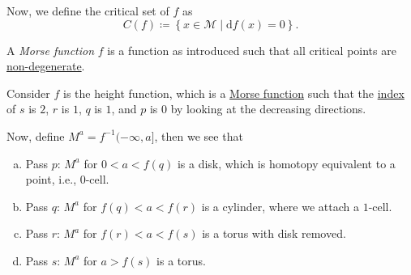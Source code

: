Now, we define the critical set of \(f\) as
\[
	C(f) \coloneqq \left\{ x\in \mathcal{M} \mid \mathrm{d} f(x) = 0 \right\}.
\]

\begin{definition}\label{def:Morse-function}
	A \emph{Morse function} \(f\) is a function as introduced such that all critical points are \hyperref[def:non-degenerate]{non-degenerate}.
\end{definition}

\begin{eg}
	Consider \(f\) is the height function, which is a \hyperref[def:Morse-function]{Morse function} such that the \hyperref[def:Morse-index]{index} of \(s\) is \(2\), \(r\) is \(1\), \(q\) is \(1\), and \(p\) is \(0\) by looking at the decreasing directions.
	\begin{center}
	\end{center}
	Now, define \(M^a = f^{-1} (-\infty , a]\), then we see that
	\begin{enumerate}[(a)]
		\item Pass \(p\): \(M^a\) for \(0 < a < f(q)\) is a disk, which is homotopy equivalent to a point, i.e., \(0\)-cell.
		\item Pass \(q\): \(M^a\) for \(f(q) < a < f(r)\) is a cylinder, where we attach a \(1\)-cell.
		\item Pass \(r\): \(M^a\) for \(f(r) < a < f(s)\) is a torus with disk removed.
		\item Pass \(s\): \(M^a\) for \(a > f(s)\) is a torus.
	\end{enumerate}
\end{eg}